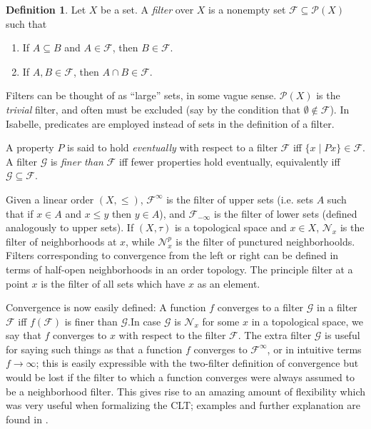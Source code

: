 \documentclass{article}
\theoremstyle{definition}
\newtheorem{definition}[theorem]{Definition}
\newcommand{\bldset}[2]{\{{#1}\mid{#2}\}}
\begin{document}
\begin{definition}
Let $X$ be a set. A {\em filter} over $X$ is a nonempty set $\mathcal F \subseteq \mathcal P(X)$ such that
\begin{enumerate}
\item If $A \subseteq B$ and $A \in \mathcal F$, then $B \in \mathcal F$.
\item If $A, B \in \mathcal F$, then $A \cap B \in \mathcal F$.
\end{enumerate}
\end{definition}

Filters can be thought of as ``large'' sets, in some vague sense. $\mathcal P(X)$ is the {\em trivial} filter, and often must be excluded (say by the condition that $\emptyset \notin \mathcal F$). In Isabelle, predicates are employed instead of sets in the definition of a filter.

A property $P$ is said to hold {\em eventually} with respect to a filter $\mathcal F$ iff $\bldset{x}{Px} \in \mathcal F$. A filter $\mathcal G$ is {\em finer than} $\mathcal F$ iff fewer properties hold eventually, equivalently iff $\mathcal G \subseteq \mathcal F$.

Given a linear order $(X,\le)$, $\mathcal F^\infty$ is the filter of upper sets (i.e. sets $A$ such that if $x \in A$ and $x \le y$ then $y \in A$), and $\mathcal F_{-\infty}$ is the filter of lower sets (defined analogously to upper sets). If $(X, \tau)$ is a topological space and $x \in X$, $\mathcal N_x$ is the filter of neighborhoods at $x$, while $\mathcal N^p_x$ is the filter of punctured neighborhoolds. Filters corresponding to convergence from the left or right can be defined in terms of half-open neighborhoods in an order topology. The principle filter at a point $x$ is the filter of all sets which have $x$ as an element.

Convergence is now easily defined: A function $f$ converges to a filter $\mathcal G$ in a filter $\mathcal F$ iff $f(\mathcal F)$ is finer than $\mathcal G$.In case $\mathcal G$ is $\mathcal N_x$ for some $x$ in a topological space, we say that $f$ converges to $x$ with respect to the filter $\mathcal F$. The extra filter $\mathcal G$ is useful for saying such things as that a function $f$ converges to $\mathcal F^\infty$, or in intuitive terms $f \rightarrow \infty$; this is easily expressible with the two-filter definition of convergence but would be lost if the filter to which a function converges were always assumed to be a neighborhood filter. This gives rise to an amazing amount of flexibility which was very useful when formalizing the CLT; examples and further explanation are found in \cite{hoelzl-filter}.
\end{document}
